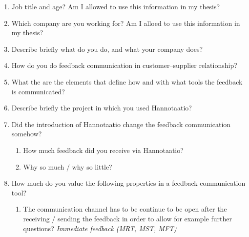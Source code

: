 \documentclass[english,12pt,a4paper,pdftex]{article}
\begin{document}
\begin{enumerate}


\item Job title and age? Am I allowed to use this information in my thesis?


\item Which company are you working for? Am I alloed to use this information in my thesis?


\item Describe briefly what do you do, and what your company does?


\item How do you do feedback communication in customer--supplier relationship?


\item What the are the elements that define how and with what tools the feedback is communicated?


\item Describe briefly the project in which you used Hannotaatio?

\item Did the introduction of Hannotaatio change the feedback communication somehow?
  \begin{enumerate}
    \item How much feedback did you receive via Hannotaatio?
    \item Why so much / why so little?
  \end{enumerate}


\item How much do you value the following properties in a feedback communication tool?
  \begin{enumerate}
    \item The communication channel has to be continue to be open after the receiving / sending the feedback in order to allow for example further questions? \emph{Immediate feedback (MRT, MST, MFT)}
    

\end{enumerate}
\end{enumerate}
\end{document}
